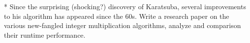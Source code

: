 *
Since the surprising (shocking?) discovery of Karatsuba,
several improvements to his algorithm has appeared since the 60s.
Write a research paper on the various new-fangled integer multiplication
algorithms, analyze and comparison their runtime performance.
